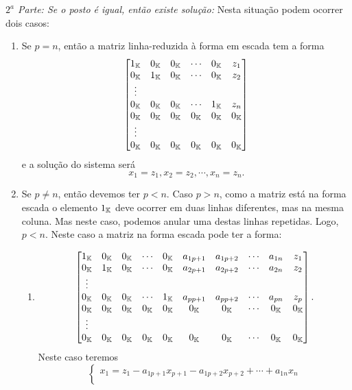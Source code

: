 \begin{prova}
	\textit{$2^a$ Parte: Se o posto \'e igual, ent\~ao existe solu\c{c}\~ao:} Nesta situa\c{c}\~ao podem ocorrer dois casos:
	\begin{enumerate}
		\item Se $p = n$, ent\~ao a matriz linha-reduzida \`a forma em escada tem a forma
		\[
			\begin{bmatrix}
				1_{\mathbb{K}} & 0_{\mathbb{K}} & 0_{\mathbb{K}} & \cdots & 0_{\mathbb{K}} & z_1\\
				0_{\mathbb{K}} & 1_{\mathbb{K}} & 0_{\mathbb{K}} & \cdots & 0_{\mathbb{K}} & z_2\\
				\vdots\\
				0_{\mathbb{K}} & 0_{\mathbb{K}} & 0_{\mathbb{K}} & \cdots & 1_{\mathbb{K}} & z_n\\
				0_{\mathbb{K}} & 0_{\mathbb{K}} & 0_{\mathbb{K}} & 0_{\mathbb{K}} & 0_{\mathbb{K}} & 0_{\mathbb{K}}\\
				\vdots\\
				0_{\mathbb{K}} & 0_{\mathbb{K}} & 0_{\mathbb{K}} & 0_{\mathbb{K}} & 0_{\mathbb{K}} & 0_{\mathbb{K}}
			\end{bmatrix}
		\]
		e a solu\c{c}\~ao do sistema ser\'a
		\[
			x_1 = z_1, x_2 = z_2, \cdots, x_n = z_n.
		\]
		\item Se $p \ne n$, ent\~ao devemos ter $p < n$. Caso $p > n$, como a matriz est\'a na forma escada o elemento $1_{\mathbb{K}}$ deve ocorrer em duas linhas diferentes, mas na mesma coluna. Mas neste caso, podemos anular uma destas linhas repetidas. Logo, $p < n$. Neste caso a matriz na forma escada pode ter a forma:
		\begin{enumerate}
			\item \[
			\begin{bmatrix}
				1_{\mathbb{K}} & 0_{\mathbb{K}} & 0_{\mathbb{K}} & \cdots & 0_{\mathbb{K}} & a_{1p+1} & a_{1p+2} & \cdots & a_{1n} & z_1\\
				0_{\mathbb{K}} & 1_{\mathbb{K}} & 0_{\mathbb{K}} & \cdots & 0_{\mathbb{K}} & a_{2p+1} & a_{2p+2} & \cdots & a_{2n} & z_2\\
				\vdots\\
				0_{\mathbb{K}} & 0_{\mathbb{K}} & 0_{\mathbb{K}} & \cdots & 1_{\mathbb{K}} & a_{pp+1} & a_{pp+2} & \cdots & a_{pn} & z_p\\
				0_{\mathbb{K}} & 0_{\mathbb{K}} & 0_{\mathbb{K}} & 0_{\mathbb{K}} & 0_{\mathbb{K}} & 0_{\mathbb{K}} & 0_{\mathbb{K}} & \cdots & 0_{\mathbb{K}} & 0_{\mathbb{K}}\\
				\vdots\\
				0_{\mathbb{K}} & 0_{\mathbb{K}} & 0_{\mathbb{K}} & 0_{\mathbb{K}} & 0_{\mathbb{K}} & 0_{\mathbb{K}} & 0_{\mathbb{K}} & \cdots & 0_{\mathbb{K}}  & 0_{\mathbb{K}}
			\end{bmatrix}.
		\]
		Neste caso teremos
		\[
			\begin{cases}
				x_1 = z_1 - a_{1 p + 1}x_{p + 1} - a_{1 p + 2}x_{p + 2} + \cdots + a_{1n}x_{n}\\

\end{cases}\]
\end{enumerate}
\end{enumerate}
\end{prova}
